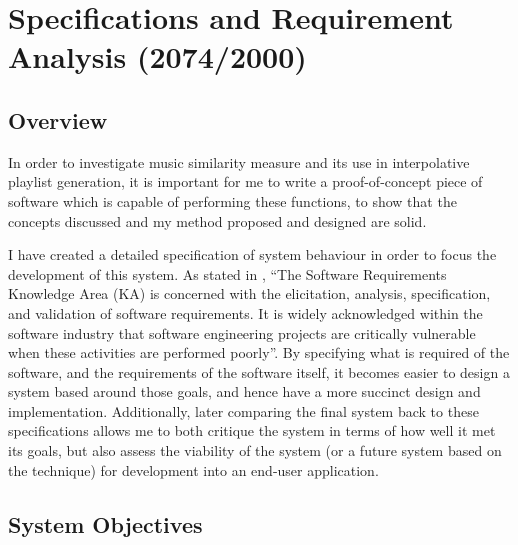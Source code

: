 %
%
\newcommand{\objective}[1]{
	\subsubsection{#1}
}
\chapter{Specifications and Requirement Analysis (2074/2000)}
\section{Overview}
In order to investigate music similarity measure and its use in interpolative playlist generation, it is important for me to write a proof-of-concept piece of software which is capable of performing these functions, to show that the concepts discussed and my method proposed and designed are solid.

I have created a detailed specification of system behaviour in order to focus the development of this system. As stated in \citet{Bourque2004}, ``The Software Requirements Knowledge Area (KA) is concerned with the elicitation, analysis, specification, and validation of software requirements. It is widely acknowledged within the software industry that software engineering projects are critically vulnerable when these activities are performed poorly''. By specifying what is required of the software, and the requirements of the software itself, it becomes easier to design a system based around those goals, and hence have a more succinct design and implementation. Additionally, later comparing the final system back to these specifications allows me to both critique the system in terms of how well it met its goals, but also assess the viability of the system (or a future system based on the technique) for development into an end-user application.
\section{System Objectives}
